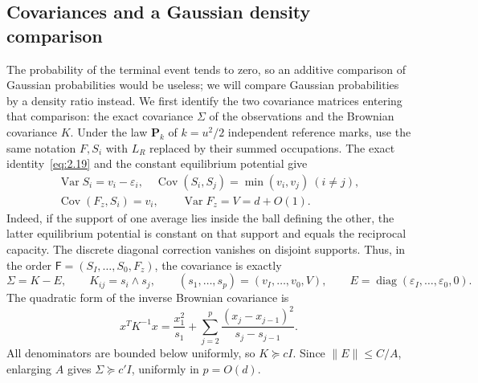 \documentclass[11pt,letterpaper,reqno]{amsart}
\newif\ifrevmarks \revmarkstrue
\newif\ifshowdeleted \showdeletedfalse
\newcommand{\add}[1]{\ifrevmarks\textcolor{revorange}{#1}\else#1\fi}
\newcommand{\del}[1]{\ifrevmarks\ifshowdeleted{\color{revorange}\footnotesize[\textit{deleted:}~#1]}%
  \else\mbox{\textsuperscript{\textcolor{revorange}{\normalfont\bfseries[del]}}}\fi\fi}
\numberwithin{equation}{section}
\theoremstyle{remark}
\DeclareMathOperator{\Var}{Var}
\DeclareMathOperator{\Cov}{Cov}
\DeclareMathOperator{\diag}{diag}
\begin{document}
\subsection{\texorpdfstring{\del{Proof of Lemma~\ref{lem:gaussian-density}}\add{Covariances and a Gaussian density comparison}}{Covariances and a Gaussian density comparison}}\label{sec:covariance}
The probability of the terminal event tends to zero, so \add{an additive comparison of Gaussian probabilities would be useless;} we will compare Gaussian probabilities by a density ratio\add{ instead}. We first identify the two covariance matrices entering that comparison\add{: the exact covariance $\Sigma$ of the observations and the Brownian covariance $K$}.
Under the law $\mathbf P_k$ of $k=u^2/2$ independent reference marks, use
the same notation $F,S_i$ with $L_R$ replaced by their summed occupations.
The exact identity~\eqref{eq:2.19} and the constant equilibrium potential give
\begin{equation}\label{eq:single-covariance}
\begin{gathered}
\Var S_i=v_i-\varepsilon_i,\quad
\Cov(S_i,S_j)=\min(v_i,v_j)\ (i\ne j),\\
\Cov(F_z,S_i)=v_i,\qquad \Var F_z=V=d+O(1).
\end{gathered}
\end{equation}
Indeed, if the support of one average lies inside the ball defining the other, the latter equilibrium potential is constant on that support and equals the reciprocal capacity. The discrete diagonal correction vanishes on disjoint supports. Thus, in the order
$\mathsf F=(S_I,\ldots,S_0,F_z)$, the covariance is exactly
\begin{equation}\label{eq:single-KE}
\Sigma=K-E,\qquad K_{ij}=s_i\wedge s_j,\qquad
(s_1,\ldots,s_p)=(v_I,\ldots,v_0,V),\qquad
E=\diag(\varepsilon_I,\ldots,\varepsilon_0,0).
\end{equation}
The quadratic form of the inverse Brownian covariance is
\[
x^TK^{-1}x=\frac{x_1^2}{s_1}
+\sum_{j=2}^p\frac{(x_j-x_{j-1})^2}{s_j-s_{j-1}}.
\]
All denominators are bounded below uniformly, so $K\succeq cI$. Since
$\|E\|\le C/A$, enlarging $A$ gives $\Sigma\succeq c'I$, uniformly in $p=O(d)$.
\end{document}
